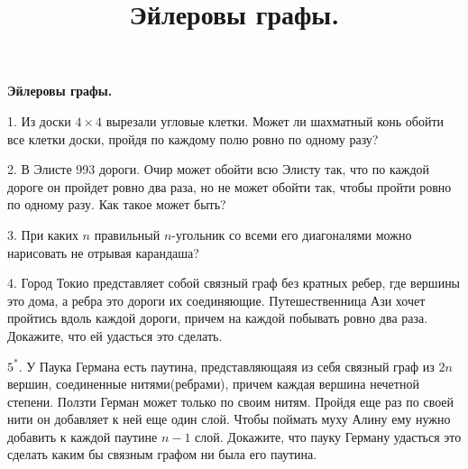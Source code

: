 \centerline{\bf \Huge Эйлеровы графы.}
\title{Эйлеровы графы.}

1. Из доски $4\times4$ вырезали угловые клетки. Может ли шахматный конь обойти все клетки доски, пройдя по каждому полю ровно по одному разу?

2. В Элисте 993 дороги. Очир может обойти всю Элисту так, что по каждой дороге он пройдет ровно два раза, но не может обойти так, чтобы пройти ровно по одному разу. Как такое может быть?

3. При каких $n$ правильный $n$-угольник со всеми его диагоналями можно нарисовать не отрывая карандаша?

4. Город Токио представляет собой связный граф без кратных ребер, где вершины это дома, а ребра это дороги их соединяющие. Путешественница Ази хочет пройтись вдоль каждой дороги, причем на каждой побывать ровно два раза. Докажите, что ей удасться это сделать.

$5^*.$ У Паука Германа есть паутина, представляющаяя из себя связный граф из $2n$ вершин, соединенные нитями(ребрами), причем каждая вершина нечетной степени. Ползти Герман может только по своим нитям.  Пройдя еще раз по своей нити он добавляет к ней еще один слой. Чтобы поймать муху Алину ему нужно добавить к каждой паутине $n-1$ слой. Докажите, что пауку Герману удасться это сделать каким бы связным графом ни была его паутина.